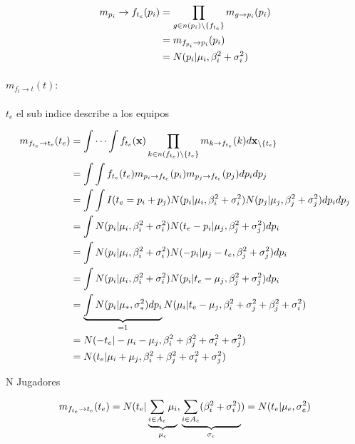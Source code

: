 \documentclass[11pt,twoside,spanish]{report} %
\begin{document}
\begin{equation}
	\centering
	\begin{split}
		m_{p_i}\rightarrow f_{t_e}(p_i) & = \prod_{g\in n(p_i)\backslash\{f_{t_e}\}} m_{g\rightarrow p_i}(p_i) \\
		& = m_{f_{p_i}\rightarrow p_i}(p_i) \\
		& =  N(p_i \vert \mu_i,\beta_i^2+\sigma_i^2)
	\end{split}
\end{equation}

\paragraph{$m_{f_{t}\rightarrow t}(t):$} $t_e$ el sub indice describe a los equipos

\begin{equation}
	\centering
	\begin{split}
		m_{f_{t_e}\rightarrow t_e}(t_e) & = \int\cdots\int f_{t_e}(\textbf{x})\prod_{k\in n(f_{t_e})\backslash\{t_e\}} m_{k\rightarrow f_{t_e}}(k)d\textbf{x}_{\backslash \{t_e\}} \\
		& = \int\int f_{t_e}(t_e) m_{p_i\rightarrow f_{t_e}}(p_i)m_{p_j\rightarrow f_{t_e}}(p_j)dp_idp_j \\
		& = \int\int I(t_e=p_i+p_j)N(p_i \vert \mu_i,\beta_i^2+\sigma_i^2)N(p_j \vert \mu_j,\beta_j^2+\sigma_j^2)dp_idp_j\\
		& = \int N(p_i \vert \mu_i,\beta_i^2+\sigma_i^2)N(t_e-p_i \vert \mu_j,\beta_j^2+\sigma_j^2)dp_i\\
		& = \int N(p_i \vert \mu_i,\beta_i^2+\sigma_i^2)N(-p_i \vert \mu_j-t_e,\beta_j^2+\sigma_j^2)dp_i\\
		& = \int N(p_i \vert \mu_i,\beta_i^2+\sigma_i^2)N(p_i \vert t_e-\mu_j,\beta_j^2+\sigma_j^2)dp_i\\
		& = \underbrace{\int N(p_i \vert \mu_{\ast},\sigma_{\ast}^2)dp_i}_{=1}N(\mu_i \vert t_e-\mu_j,\beta_i^2+\sigma_j^2+\beta_j^2+\sigma_i^2)\\
		& =N(-t_e \vert -\mu_i-\mu_j,\beta_i^2+\beta_j^2+\sigma_i^2+\sigma_j^2)\\
		& =N(t_e \vert \mu_i+\mu_j,\beta_i^2+\beta_j^2+\sigma_i^2+\sigma_j	^2)\\
	\end{split}
\end{equation}

N Jugadores

\begin{equation}
	\centering
	m_{f_{t_e}\rightarrow t_e}(t_e)  = N(t_e \vert \underbrace{\sum_{i\in A_e}\mu_i}_{ \mu_e},\underbrace{\sum_{i\in A_e}(\beta_i^2+\sigma_i^2)}_{\sigma_e})
	=N(t_e \vert  \mu_e,\sigma_e^2)
\end{equation}
\end{document}
